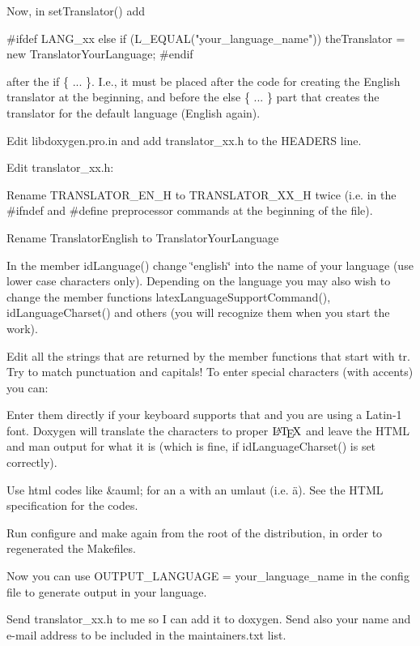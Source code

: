 \begin{DoxyEnumerate}
Now, in {\ttfamily setTranslator()} add \begin{DoxyVerb}
#ifdef LANG_xx
    else if (L_EQUAL("your_language_name"))
    {
      theTranslator = new TranslatorYourLanguage;
    }
#endif    
\end{DoxyVerb}
 after the {\ttfamily if \{ ... \}}. I.e., it must be placed after the code for creating the English translator at the beginning, and before the {\ttfamily else \{ ... \}} part that creates the translator for the default language (English again). 
\item Edit libdoxygen.pro.in and add {\ttfamily translator\_\-xx.h} to the {\ttfamily HEADERS} line. 
\item Edit {\ttfamily translator\_\-xx.h}: 
\begin{DoxyItemize}
\item Rename {\ttfamily TRANSLATOR\_\-EN\_\-H} to {\ttfamily TRANSLATOR\_\-XX\_\-H} twice (i.e. in the {\ttfamily \#ifndef} and {\ttfamily \#define} preprocessor commands at the beginning of the file). 
\item Rename TranslatorEnglish to TranslatorYourLanguage 
\item In the member {\ttfamily idLanguage()} change \char`\"{}english\char`\"{} into the name of your language (use lower case characters only). Depending on the language you may also wish to change the member functions latexLanguageSupportCommand(), idLanguageCharset() and others (you will recognize them when you start the work). 
\item Edit all the strings that are returned by the member functions that start with tr. Try to match punctuation and capitals! To enter special characters (with accents) you can: 
\begin{DoxyItemize}
\item Enter them directly if your keyboard supports that and you are using a Latin-\/1 font. Doxygen will translate the characters to proper $\mbox{\LaTeX}$ and leave the HTML and man output for what it is (which is fine, if idLanguageCharset() is set correctly). 
\item Use html codes like \&auml; for an a with an umlaut (i.e. \"{a}). See the HTML specification for the codes. 
\end{DoxyItemize}
\end{DoxyItemize}
\item Run configure and make again from the root of the distribution, in order to regenerated the Makefiles. 
\item Now you can use {\ttfamily OUTPUT\_\-LANGUAGE = your\_\-language\_\-name} in the config file to generate output in your language. 
\item Send {\ttfamily translator\_\-xx.h} to me so I can add it to doxygen. Send also your name and e-\/mail address to be included in the {\ttfamily maintainers.txt} list. 
\end{DoxyEnumerate}

